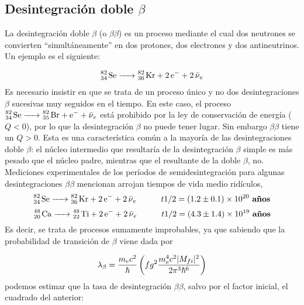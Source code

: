 \subsection{Desintegración doble $\beta$}

La desintegración doble $\beta$ (o $\beta \beta$) es un proceso mediante el cual dos neutrones se convierten ``simultáneamente'' en dos protones, dos electrones y dos antineutrinos. Un ejemplo es el siguiente:

\begin{eqnarray}
	\ce{^82_34 Se -> ^82_36 Kr + 2e^- + 2\bar{\nu}_e}
\end{eqnarray}
Es necesario insistir en que se trata de un proceso único y no dos desintegraciones $\beta$ sucesivas muy seguidos en el tiempo. En este caso, el proceso $
\ce{^82_34 Se -> ^82_35 Br + e^- + \bar{\nu}_e}$ está prohibido por la ley de conservación de energía ($Q<0$), por lo que la desintegración $\beta$ no puede tener lugar. Sin embargo $\beta \beta$ tiene un $Q>0$. Esta es una característica común a la mayoría de las desintegraciones doble $\beta$: el núcleo intermedio que resultaría de la desintegración $\beta$ simple es más pesado que el núcleo padre, mientras que el resultante de la doble $\beta$, no. \\

Mediciones experimentales de los períodos de semidesintegración para  algunas desintegraciones $\beta \beta$ mencionan arrojan tiempos de vida medio ridículos, 
\begin{equation}
	\ce{^82_34 Se -> ^82_36 Kr + 2e^- + 2\bar{\nu}_e} \tquad t{1/2} = (1.2\pm 0.1)\times10^{20} \ \textbf{años}
\end{equation}
\begin{equation}
\ce{^48_20 Ca -> ^48_22 Ti + 2e^- + 2\bar{\nu}_e} \tquad t{1/2} = (4.3\pm 1.4)\times10^{19} \ \textbf{años}
\end{equation}
Es decir, se trata de procesos sumamente improbables, ya que sabiendo que la probabilidad de transición de $\beta$ viene dada por

\begin{equation}
	\lambda_\beta = \frac{m_e c^2}{\hbar} \left( fg^2 \frac{m_e^4 c^2 |M_{fi}|^2}{2\pi^3 \hbar^6} \right)
\end{equation}
podemos estimar que la tasa de desintegración $\beta \beta$, salvo por el factor inicial, el cuadrado del anterior:

